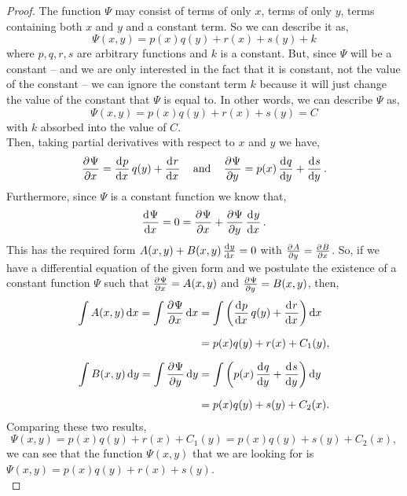 \documentclass[../MathsNotesBase.tex]{subfiles}
\begin{document}
{		
	
		\begin{tcolorbox}[breakable,enhanced jigsaw,colframe=white,colback=white,boxrule=0pt,arc=0pt,left=0pt,right=0pt,top=0pt,bottom=0pt]
			\begin{proof}
				The function $\Psi$ may consist of terms of only $x$, terms of only $y$, terms containing both $x$ and $y$ and a constant term. So we can describe it as,
				\[ \Psi(x,y) = p(x)q(y) + r(x) + s(y) + k \]
				where ${ p,q,r,s }$ are arbitrary functions and $k$ is a constant. But, since $\Psi$ will be a constant -- and we are only interested in the fact that it is constant, not the value of the constant -- we can ignore the constant term $k$ because it will just change the value of the constant that $\Psi$ is equal to. In other words, we can describe $\Psi$ as,
				\[ \Psi(x,y) = p(x)q(y) + r(x) + s(y) = C \]
				with $k$ absorbed into the value of $C$.\\
				
				Then, taking partial derivatives with respect to $x$ and $y$ we have,
				\[ \dpd{\Psi}{x} = \dod{p}{x} q(y) + \dod{r}{x} \eqand \dpd{\Psi}{y} = p(x) \dod{q}{y} + \dod{s}{y}. \]
				Furthermore, since $\Psi$ is a constant function we know that,
				\[ \dod{\Psi}{x} = 0 = \dpd{\Psi}{x} + \dpd{\Psi}{y} \dod{y}{x}. \]
				This has the required form ${ A(x,y) + B(x,y)\tod{y}{x} = 0 }$ with ${ \tpd{A}{y} = \tpd{B}{x} }$. So, if we have a differential equation of the given form and we postulate the existence of a constant function $\Psi$ such that ${ \tpd{\Psi}{x} = A(x,y) }$ and ${ \tpd{\Psi}{y} = B(x,y) }$, then,
				\begin{align*}
					\int A(x,y) \dif x = \int \dpd{\Psi}{x} \dif x &= \int \left( \dod{p}{x} q(y) + \dod{r}{x} \right) \dif x\nn
					 &= p(x) q(y) + r(x) + C_1(y), \nn
					\int B(x,y) \dif y = \int \dpd{\Psi}{y} \dif y &= \int \left( p(x) \dod{q}{y} + \dod{s}{y} \right) \dif y  \nn
					&= p(x) q(y) + s(y) + C_2(x).
				\end{align*}
				Comparing these two results,
				\[ \Psi(x,y) = p(x) q(y) + r(x) + C_1(y) = p(x) q(y) + s(y) + C_2(x), \]
				we can see that the function $\Psi(x,y)$ that we are looking for is ${ \Psi(x,y) = p(x)q(y) + r(x) + s(y) }$.\\
				

\end{proof}
\end{tcolorbox}}
\end{document}
